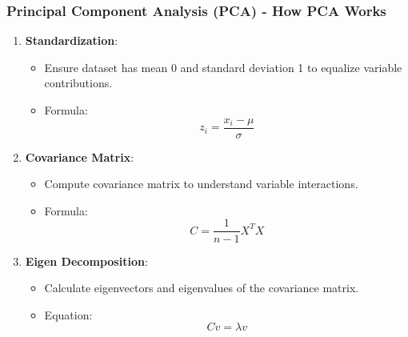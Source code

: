 \documentclass[aspectratio=169]{beamer}
\begin{document}
\begin{frame}[fragile]
    \frametitle{Principal Component Analysis (PCA) - How PCA Works}
    \begin{enumerate}
        \item \textbf{Standardization}: 
        \begin{itemize}
            \item Ensure dataset has mean 0 and standard deviation 1 to equalize variable contributions.
            \item Formula: 
            \[
            z_i = \frac{x_i - \mu}{\sigma}
            \]
        \end{itemize}
        
        \item \textbf{Covariance Matrix}: 
        \begin{itemize}
            \item Compute covariance matrix to understand variable interactions.
            \item Formula: 
            \[
            C = \frac{1}{n-1} X^T X
            \]
        \end{itemize}
        
        \item \textbf{Eigen Decomposition}: 
        \begin{itemize}
            \item Calculate eigenvectors and eigenvalues of the covariance matrix.
            \item Equation: 
            \[
            C v = \lambda v
            \]
        \end{itemize}
    \end{enumerate}
\end{frame}
\end{document}
